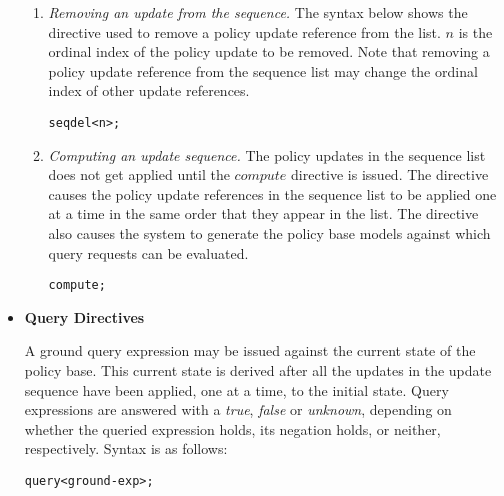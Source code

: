 \documentclass[11pt]{report}
\newenvironment{vverbatim}
{
  \begin{alltt}
}
{
    \vspace{-\baselineskip}
  \end{alltt}
}
\begin{document}
\begin{itemize}
\begin{enumerate}
              \item
                {\em Removing an update from the sequence.}
                The syntax below shows the directive used to remove a
                policy update reference from the list. $n$ is the ordinal
                index of the policy update to be removed. Note that removing
                a policy update reference from the sequence list may change
                the ordinal index of other update references.

                \begin{vverbatim}
  seq del <n>;
                \end{vverbatim}

              \item
                {\em Computing an update sequence.}
                The policy updates in the sequence list does not get applied
                until the $compute$ directive is issued. The directive causes
                the policy update references in the sequence list to be
                applied one at a time in the same order that they appear in
                the list. The directive also causes the system to generate
                the policy base models against which query requests can be
                evaluated.

                \begin{vverbatim}
  compute;
                \end{vverbatim}
            \end{enumerate}

          \item
            {\bf Query Directives}

            A ground query expression may be issued against the current state
            of the policy base. This current state is derived after all the
            updates in the update sequence have been applied, one at a time,
            to the initial state. Query expressions are answered with a
            {\em true}, {\em false} or {\em unknown}, depending on whether
            the queried expression holds, its negation holds, or neither,
            respectively. Syntax is as follows:

            \begin{vverbatim}
  query <ground-exp>;
            \end{vverbatim}

        \end{itemize}
\end{document}
